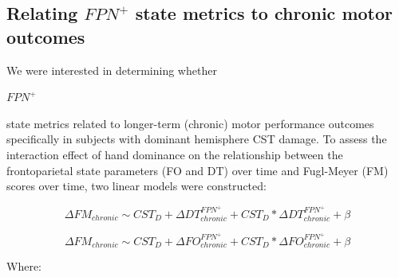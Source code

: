 \documentclass[phd,tocprelim]{cornell}
\begin{document}
	 \subsection{Relating $FPN^+$ state metrics to chronic motor  outcomes}
     We were interested in determining whether \begin{Large}$FPN^+$\end{Large} state metrics related to longer-term (chronic) motor performance outcomes specifically in subjects with dominant hemisphere CST damage. To assess the interaction effect of hand dominance on the relationship between the frontoparietal state parameters (FO and DT) over time and Fugl-Meyer (FM) scores over time, two linear models were constructed:

     \begin{center}
      \begin{Large}
	 \begin{equation}
	    \Delta FM_{chronic} \sim  CST_D + \Delta DT^{FPN^+}_{chronic} + CST_D*\Delta DT^{FPN^+}_{chronic} + \beta
	\end{equation} 

	 \begin{equation}
	    \Delta FM_{chronic} \sim  CST_D + \Delta FO^{FPN^+}_{chronic} + CST_D*\Delta FO^{FPN^+}_{chronic} + \beta  
	\end{equation}
		\end{Large}
	\end{center}

	Where:
	
\end{document}
